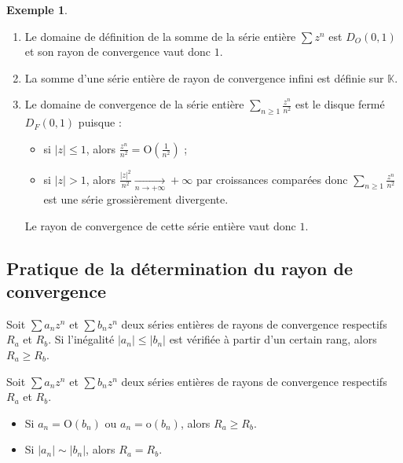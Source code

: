 \documentclass[french]{article}
\newcommand{\K}{\mathbb{K}}
\renewcommand{\o}{\text{o}}
\renewcommand{\O}{\text{O}}
\theoremstyle{plain}
\theoremstyle{definition}
\newtheorem*{ex}{Exemple}
\theoremstyle{remark}
\begin{document}
\begin{ex}%
	\begin{enumerate}
		\item Le domaine de définition de la somme de la série entière $\displaystyle \sum z^n$ est $D_O(0,1)$ et son rayon de convergence vaut donc $1$.
		\item La somme d'une série entière de rayon de convergence infini est définie sur $\K$.
		\item Le domaine de convergence de la série entière $\displaystyle\sum_{n\geqslant 1}\frac{z^n}{n^2}$ est le disque fermé $D_F(0,1)$ puisque :
		\begin{itemize}
			\item si $\lvert z\rvert\leqslant 1$, alors $\displaystyle\frac{z^n}{n^2}=\O\left(\frac{1}{n^2}\right)$ ;
			\item si $\lvert z\rvert >1$, alors $\displaystyle\frac{\lvert z\rvert^2}{n^2}\xrightarrow[n\to+\infty]{}+\infty$ par croissances comparées donc $\displaystyle\sum_{n\geqslant 1}\frac{z^n}{n^2}$ est une série grossièrement divergente.
		\end{itemize}
		Le rayon de convergence de cette série entière vaut donc $1$.
	\end{enumerate}
\end{ex}

\subsection{Pratique de la détermination du rayon de convergence}

\begin{prop}[Comparaison]%
	Soit $\displaystyle\sum a_nz^n$ et $\displaystyle\sum b_nz^n$ deux séries entières de rayons de convergence respectifs $R_a$ et $R_b$. Si l'inégalité $\lvert a_n\rvert\leqslant\lvert b_n\rvert$ est vérifiée à partir d'un certain rang, alors $R_a\geqslant R_b$.
\end{prop}

\begin{cor}%
	Soit $\displaystyle\sum a_nz^n$ et $\displaystyle\sum b_nz^n$ deux séries entières de rayons de convergence respectifs $R_a$ et $R_b$.
	\begin{itemize}
		\item Si $a_n=\O(b_n)$ ou $a_n=\o(b_n)$, alors $R_a\geqslant R_b$.
		\item Si $\lvert a_n\rvert\sim \lvert b_n\rvert$, alors $R_a=R_b$.
	\end{itemize}
\end{cor}
\end{document}

